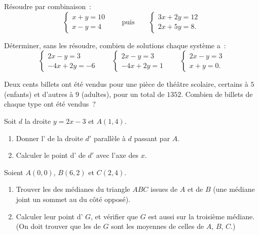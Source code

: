 \begin{exercise}[$\star$]\label{exo:g10:lines:6}
Résoudre par combinaison~:
\[
\begin{cases}
x + y = 10 \\
x - y = 4
\end{cases}
\qquad\text{puis}\qquad
\begin{cases}
3x + 2y = 12 \\
2x + 5y = 8 .
\end{cases}
\]
\end{exercise}

\begin{exercise}[$\star\star$]\label{exo:g10:lines:7}
Déterminer, sans les résoudre, combien de solutions chaque système
a~:
\[
\begin{cases}
2x - y = 3 \\
-4x + 2y = -6
\end{cases}
\qquad
\begin{cases}
2x - y = 3 \\
-4x + 2y = 1
\end{cases}
\qquad
\begin{cases}
2x - y = 3 \\
x + y = 0 .
\end{cases}
\]
\end{exercise}

\begin{exercise}[$\star\star$]\label{exo:g10:lines:8}
Deux cents billets ont été vendus pour une pièce de théâtre scolaire,
certains à $5$ (enfants) et d'autres à $9$ (adultes), pour un total de
$1352$. Combien de billets de chaque type ont été vendus~?
\end{exercise}

\begin{exercise}[$\star\star$]\label{exo:g10:lines:9}
Soit $d$ la droite $y = 2x - 3$ et $A(1, 4)$.
\begin{enumerate}
  \item Donner l' de la droite $d'$ parallèle à $d$ passant par
        $A$.
  \item Calculer le point d' de $d'$ avec l'axe des $x$.
\end{enumerate}
\end{exercise}

\begin{exercise}[$\star\star\star$]\label{exo:g10:lines:10}
Soient $A(0, 0)$, $B(6, 2)$ et $C(2, 4)$.
\begin{enumerate}
  \item Trouver les  des médianes du triangle $ABC$ issues de
        $A$ et de $B$ (une médiane joint un sommet au  du côté
        opposé).
  \item Calculer leur point d' $G$, et vérifier que $G$ est
        aussi sur la troisième médiane. (On doit trouver que les
         de $G$ sont les moyennes de celles de $A$, $B$,
        $C$.)
\end{enumerate}
\end{exercise}

